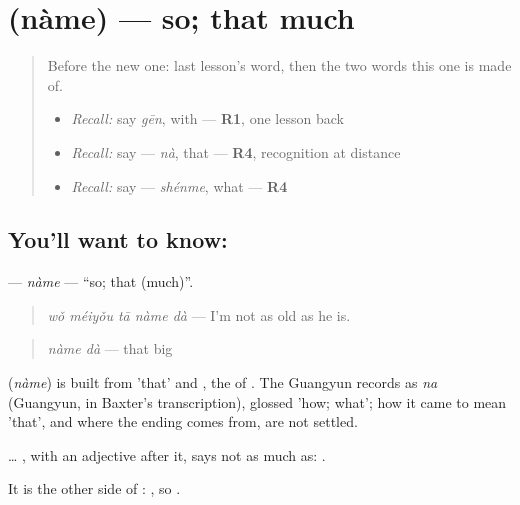 \section[\texorpdfstring{\zh{那么} (nàme)}{那么 (nàme)}]{ (nàme) — so; that much}

\label{lesson:ZH-C153-name}



\begin{quote}
Before the new one: last lesson's word, then the two words this one is made of.

\begin{itemize}
\raggedright
  \item \emph{Recall:} say \emph{gēn}, with — \textbf{R1}, one lesson back
  \item \emph{Recall:} say  — \emph{nà}, that — \textbf{R4}, recognition at distance
  \item \emph{Recall:} say  — \emph{shénme}, what — \textbf{R4}
\end{itemize}
\end{quote}

\subsection*{You'll want to know: }
\textbf{} — \emph{nàme} — \textquotedblleft{}so; that (much)\textquotedblright{}.

\begin{quote}
\textbf{} \emph{wǒ méiyǒu tā nàme dà} — I'm not as old as he is.
\end{quote}

\begin{quote}
\textbf{} \emph{nàme dà} — that big
\end{quote}

\begin{cousinweb}
\textbf{} (\emph{nàme}) is built from  'that' and , the  of . The Guangyun records  as \emph{na} (Guangyun, in Baxter's transcription), glossed 'how; what'; how it came to mean 'that', and where the ending  comes from, are not settled.
\end{cousinweb}

\begin{grammarlens}[title={What you've built}]
 … , with an adjective after it, says not as much as: .

It is the other side of : , so .
\end{grammarlens}


